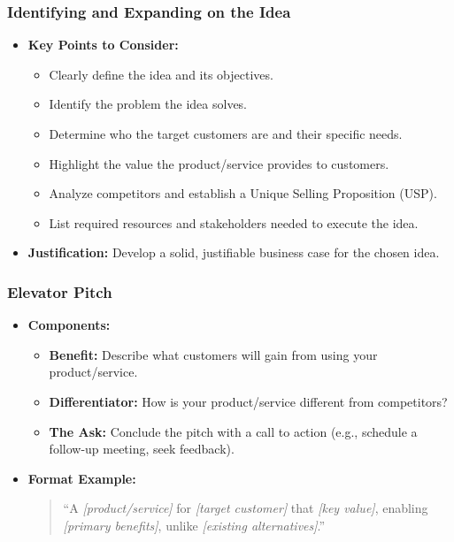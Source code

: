 \documentclass[a4paper,11pt]{article}
\begin{document}
\subsubsection{Identifying and Expanding on the Idea}
\begin{itemize}
    \item \textbf{Key Points to Consider:}
    \begin{itemize}
        \item Clearly define the idea and its objectives.
        \item Identify the problem the idea solves.
        \item Determine who the target customers are and their specific needs.
        \item Highlight the value the product/service provides to customers.
        \item Analyze competitors and establish a Unique Selling Proposition (USP).
        \item List required resources and stakeholders needed to execute the idea.
    \end{itemize}
    \item \textbf{Justification:} Develop a solid, justifiable business case for the chosen idea.
\end{itemize}

\subsubsection{Elevator Pitch}
\begin{itemize}
    \item \textbf{Components:}
    \begin{itemize}
        \item \textbf{Benefit:} Describe what customers will gain from using your product/service.
        \item \textbf{Differentiator:} How is your product/service different from competitors?
        \item \textbf{The Ask:} Conclude the pitch with a call to action (e.g., schedule a follow-up meeting, seek feedback).
    \end{itemize}
    \item \textbf{Format Example:}
    \begin{quote}
        “A \textit{[product/service]} for \textit{[target customer]} that \textit{[key value]}, enabling \textit{[primary benefits]}, unlike \textit{[existing alternatives]}.”
    \end{quote}
\end{itemize}
\end{document}
